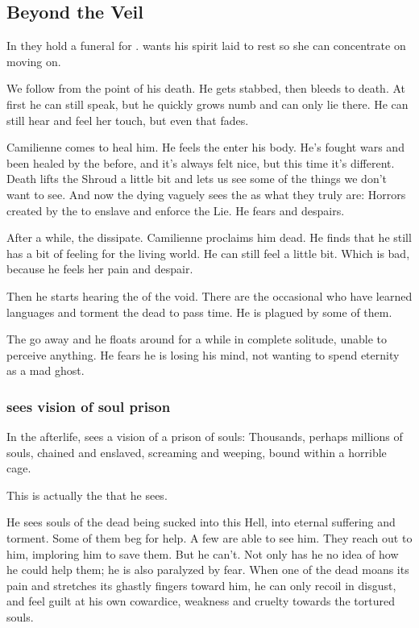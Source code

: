 \subsection{Beyond the Veil}
In \Malcur they hold a funeral for \Icor. \Tiroco{} wants his spirit laid to rest so she can concentrate on moving on. 

We follow \Icor{} from the point of his death. He gets stabbed, then bleeds to death. At first he can still speak, but he quickly grows numb and can only lie there. He can still hear \Tiroco{} and feel her touch, but even that fades. 

Camilienne comes to heal him. He feels the \Sephiroth{} enter his body. He's fought wars and been healed by the \Sephiroth{} before, and it's always felt nice, but this time it's different. Death lifts the Shroud a little bit and lets us see some of the things we don't want to see. And now the dying \Icor{} vaguely sees the \Sephiroth{} as what they truly are: Horrors created by the \banes{} to enslave \humanity{} and enforce the Lie. He fears and despairs. 

After a while, the \Sephiroth{} dissipate. Camilienne proclaims him dead. He finds that he still has a bit of feeling for the living world. He can still feel \Tiroco{} a little bit. Which is bad, because he feels her pain and despair. 

Then he starts hearing the \daemons{} of the void. There are the occasional \daemons{} who have learned \Miithian{} languages and torment the dead to pass time. He is plagued by some of them. 

The \daemons{} go away and he floats around for a while in complete solitude, unable to perceive anything. He fears he is losing his mind, not wanting to spend eternity as a mad ghost. 






\subsubsection{\Icor{} sees vision of soul prison}
In the afterlife, \Icor{} sees a vision of a prison of souls: Thousands, perhaps millions of souls, chained and enslaved, screaming and weeping, bound within a horrible cage. 

This is actually the \Sephiroth{} that he sees. 

He sees souls of the dead being sucked into this Hell, into eternal suffering and torment. Some of them beg for help. A few are able to see him. They reach out to him, imploring him to save them. But he can't. Not only has he no idea of how he could help them; he is also paralyzed by fear. When one of the dead moans its pain and stretches its ghastly fingers toward him, he can only recoil in disgust, and feel guilt at his own cowardice, weakness and cruelty towards the tortured souls. 

